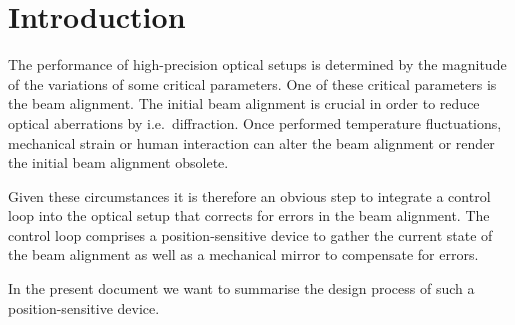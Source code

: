 \section{Introduction}

The performance of high-precision optical setups is determined by the magnitude of the variations of some critical parameters.
One of these critical parameters is the beam alignment.
The initial beam alignment is crucial in order to reduce optical aberrations by i.e.\ diffraction.
Once performed temperature fluctuations, mechanical strain or human interaction can alter the beam alignment or render the initial beam alignment obsolete.

Given these circumstances it is therefore an obvious step to integrate a control loop into the optical setup that corrects for errors in the beam alignment.
The control loop comprises a position-sensitive device to gather the current state of the beam alignment as well as a mechanical mirror to compensate for errors. 

In the present document we want to summarise the design process of such a position-sensitive device.